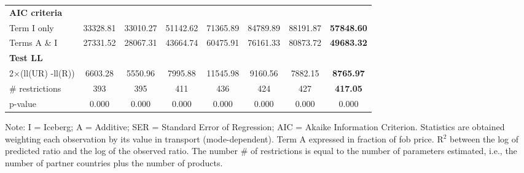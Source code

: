 \documentclass[a4paper,11pt]{article}
\begin{document}
\begin{table}[htbp]
\begin{center}
\begin{tabular}{lccccccc}
\textbf{AIC criteria} & \multicolumn{1}{c}{} & \multicolumn{1}{c}{} & \multicolumn{1}{c}{} & \multicolumn{1}{c}{} & \multicolumn{1}{c}{} & \multicolumn{1}{c}{} & \multicolumn{1}{c}{\textbf{}} \\
Term I only & \multicolumn{1}{c}{33328.81} & \multicolumn{1}{c}{33010.27} & \multicolumn{1}{c}{51142.62} & \multicolumn{1}{c}{71365.89} & \multicolumn{1}{c}{84789.89} & \multicolumn{1}{c}{88191.87} & \multicolumn{1}{c}{\textbf{57848.60}} \\
Terms A \& I & \multicolumn{1}{c}{27331.52} & \multicolumn{1}{c}{28067.31} & \multicolumn{1}{c}{43664.74} & \multicolumn{1}{c}{60475.91} & \multicolumn{1}{c}{76161.33} & \multicolumn{1}{c}{80873.72} & \multicolumn{1}{c}{\textbf{49683.32}} \\
\textbf{Test LL} &       &       &       &       & \multicolumn{1}{c}{} &       & \multicolumn{1}{c}{\textbf{}} \\
2$\times$(ll(UR) -ll(R)) & \multicolumn{1}{c}{6603.28} & \multicolumn{1}{c}{5550.96} & \multicolumn{1}{c}{7995.88} & \multicolumn{1}{c}{11545.98} & \multicolumn{1}{c}{9160.56} & \multicolumn{1}{c}{7882.15} & \multicolumn{1}{c}{\textbf{8765.97}} \\
\# restrictions  & \multicolumn{1}{c}{393} & \multicolumn{1}{c}{395} & \multicolumn{1}{c}{411} & \multicolumn{1}{c}{436} & \multicolumn{1}{c}{424} & \multicolumn{1}{c}{427} & \multicolumn{1}{c}{\textbf{417.05}} \\
p-value & \multicolumn{1}{c}{0.000} & \multicolumn{1}{c}{0.000} & \multicolumn{1}{c}{0.000} & \multicolumn{1}{c}{0.000} & \multicolumn{1}{c}{0.000} & \multicolumn{1}{c}{0.000} & \multicolumn{1}{c}{0.000} \\


\hline\hline

    \end{tabular}%
    \end{center}
  \label{tab:good_fit_ves}%
  \tiny{Note: I = Iceberg; A = Additive; SER = Standard Error of Regression; AIC = Akaike Information Criterion. Statistics are obtained weighting each observation by its value in transport (mode-dependent). Term A expressed in fraction of fob price. R$^{2}$ between the log of predicted ratio and the log of the observed ratio. The number \# of restrictions is equal to the number of parameters estimated, i.e., the number of partner countries plus the number of products.}
\end{table}%


%
\end{document}

